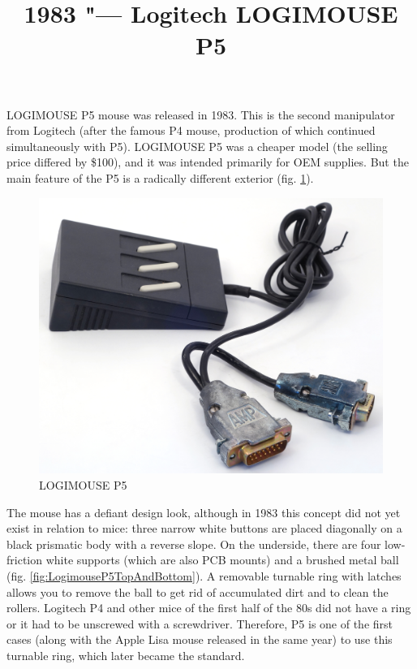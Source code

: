 \documentclass[11pt, a4paper]{article}
\begin{document}
\title{1983 "--- Logitech LOGIMOUSE P5}
\date{}
\maketitle

LOGIMOUSE P5 mouse was released in 1983. This is the second manipulator from Logitech (after the famous  P4 mouse, production of which continued simultaneously with P5). LOGIMOUSE P5 was a cheaper model (the selling price differed by \$100), and it was intended primarily for OEM supplies. But the main feature of the P5 is a radically different exterior (fig. \ref{fig:LogimouseP5Pic}).

\begin{figure}[h]
   \centering
    \includegraphics[scale=0.35]{1983_logitech_logimouse_p5/pic_30.jpg}
    \caption{LOGIMOUSE P5}
    \label{fig:LogimouseP5Pic}
\end{figure}

The mouse has a defiant design look, although in 1983 this concept did not yet exist in relation to mice: three narrow white buttons are placed diagonally on a black prismatic body with a reverse slope. On the underside, there are four low-friction white supports (which are also PCB mounts) and a brushed metal ball (fig. \ref{fig:LogimouseP5TopAndBottom}). A removable turnable ring with latches allows you to remove the ball to get rid of accumulated dirt and to clean the rollers. Logitech P4 and other mice of the first half of the 80s did not have a ring or it had to be unscrewed with a screwdriver. Therefore, P5 is one of the first cases (along with the Apple Lisa mouse released in the same year) to use this turnable ring, which later became the standard.
\end{document}
